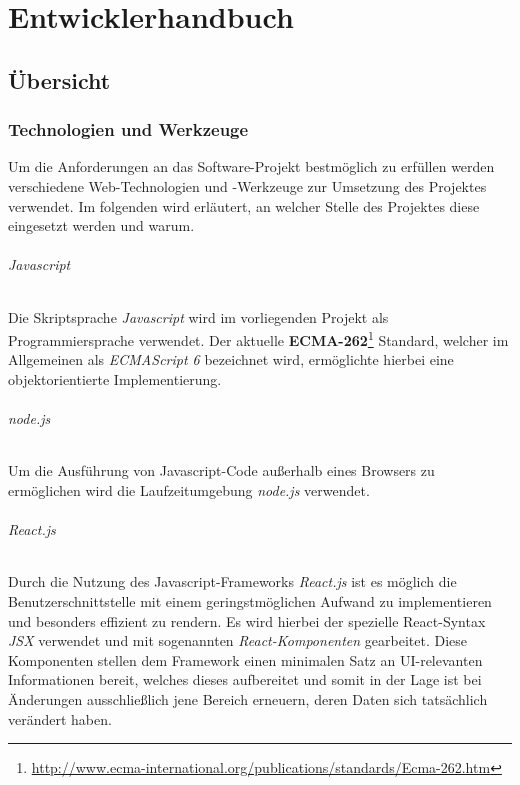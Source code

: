 \part{Entwicklerhandbuch}

\chapter{Übersicht}
\section{Technologien und Werkzeuge}
Um die Anforderungen an das Software-Projekt bestmöglich zu erfüllen werden verschiedene Web-Technologien und -Werkzeuge zur Umsetzung des Projektes verwendet. Im folgenden wird erläutert, an welcher Stelle des Projektes diese eingesetzt werden und warum.

\paragraph{Javascript}
Die Skriptsprache \textit{Javascript} wird im vorliegenden Projekt als Programmiersprache verwendet.
Der aktuelle \textbf{ECMA-262}\footnote{\url{http://www.ecma-international.org/publications/standards/Ecma-262.htm}} Standard, welcher im Allgemeinen als \textit{ECMAScript 6} bezeichnet wird, ermöglichte hierbei eine objektorientierte Implementierung.

\paragraph{node.js}
Um die Ausführung von Javascript-Code außerhalb eines Browsers zu ermöglichen wird die Laufzeitumgebung \textit{node.js} verwendet.

\paragraph{React.js}
Durch die Nutzung des Javascript-Frameworks \textit{React.js} ist es möglich die Benutzerschnittstelle mit einem geringstmöglichen Aufwand zu implementieren und besonders effizient zu rendern.
Es wird hierbei der spezielle React-Syntax \textit{JSX} verwendet und mit sogenannten \textit{React-Komponenten} gearbeitet.
Diese Komponenten stellen dem Framework einen minimalen Satz an UI-relevanten Informationen bereit, welches dieses aufbereitet und somit in der Lage ist bei Änderungen ausschließlich jene Bereich erneuern, deren Daten sich tatsächlich verändert haben.

